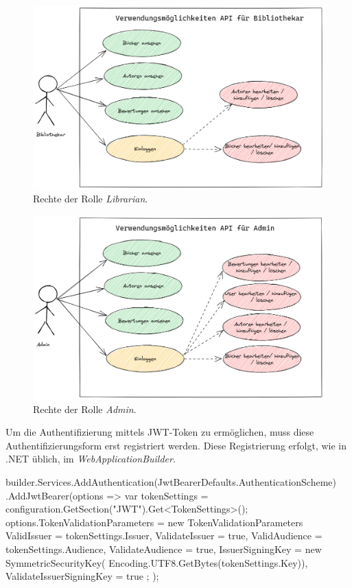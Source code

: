\begin{figure}[H]
    \includegraphics[width=\textwidth]{pics/UseCaseLibrarian.png}
    \caption{Rechte der Rolle \textit{Librarian}.}
\end{figure}

\begin{figure}[H]
    \includegraphics[width=\textwidth]{pics/UseCaseAdmin.png}
    \caption{Rechte der Rolle \textit{Admin}.}
\end{figure}

Um die Authentifizierung mittels JWT-Token zu ermöglichen, muss diese Authentifizierungsform erst registriert werden. %
Diese Registrierung erfolgt, wie in .NET üblich, im \textit{WebApplicationBuilder}.

\begin{JsCode}
builder.Services.AddAuthentication(JwtBearerDefaults.AuthenticationScheme)
.AddJwtBearer(options => {
    var tokenSettings = configuration.GetSection("JWT").Get<TokenSettings>();
    options.TokenValidationParameters = new TokenValidationParameters {
        ValidIssuer = tokenSettings.Issuer,
        ValidateIssuer = true,
        ValidAudience = tokenSettings.Audience,
        ValidateAudience = true,
        IssuerSigningKey = new SymmetricSecurityKey(
                                Encoding.UTF8.GetBytes(tokenSettings.Key)),
        ValidateIssuerSigningKey = true
    };
});
\end{JsCode}

